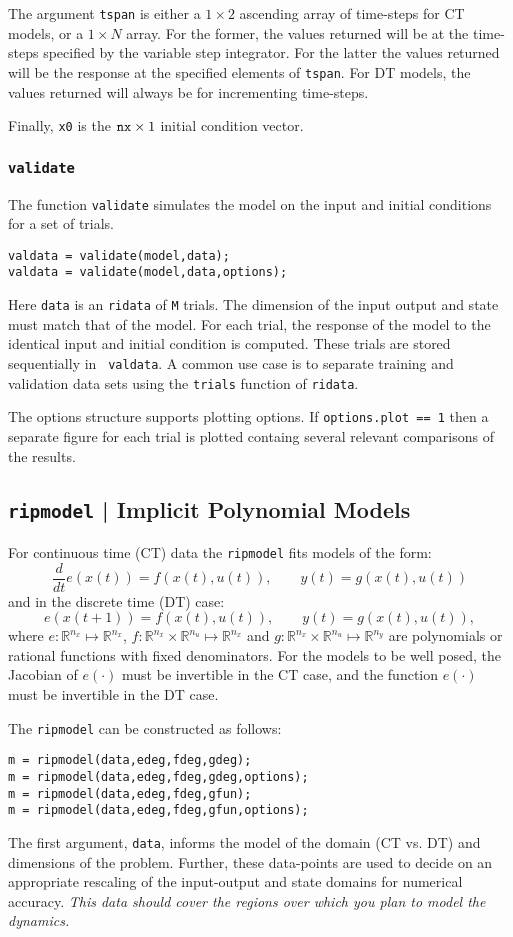 \documentclass{article}
\newcommand{\RR}{\mathbb{R}}
\begin{document}
The argument {\tt tspan} is either a $1 \times 2$ ascending array of
time-steps for CT models, or a $1 \times N$ array.  For the former,
the values returned will be at the time-steps specified by the
variable step integrator.  For the latter the values returned will be
the response at the specified elements of {\tt tspan}.
For DT models, the values returned will always be for incrementing time-steps.

Finally, {\tt x0} is the ${\tt nx} \times 1$ initial condition vector.

\subsubsection{{\tt validate}}
The function {\tt validate} simulates the model on the input and
initial conditions for a set of trials.
\begin{verbatim}
valdata = validate(model,data);
valdata = validate(model,data,options);
\end{verbatim}
Here {\tt data} is an {\tt ridata} of {\tt M} trials.  The dimension
of the input output and state must match that of the model.  For each
trial, the response of the model to the identical input and initial
condition is computed.  These trials are stored sequentially in {\tt
  valdata}.
A common use case is to separate training and validation data sets
using the {\tt trials} function of {\tt ridata}.

The options structure supports plotting options. If {\tt options.plot
  == 1} then a separate figure for each trial is plotted containg
several relevant comparisons of the results.

\subsection{{\tt ripmodel} | Implicit Polynomial Models}
For continuous time (CT) data the {\tt ripmodel}  fits models of the form:
$$ \frac{d}{dt}e(x(t)) = f(x(t),u(t)), \qquad y(t) = g(x(t),u(t))$$
and in the discrete time (DT) case:
$$ e(x(t+1)) = f(x(t),u(t)), \qquad y(t) = g(x(t),u(t)),$$
where $e: \RR^{n_x} \mapsto \RR^{n_x}$, $f: \RR^{n_x} \times
\RR^{n_u}\mapsto \RR^{n_x}$ and $g: \RR^{n_x} \times \RR^{n_u}\mapsto
\RR^{n_y}$ are polynomials or rational functions with fixed
denominators.  For the models to be well posed, the Jacobian of
$e(\cdot)$ must be invertible in the CT case, and the function
$e(\cdot)$ must be invertible in the DT case.

The {\tt ripmodel} can be constructed as follows:
\begin{verbatim}
m = ripmodel(data,edeg,fdeg,gdeg);
m = ripmodel(data,edeg,fdeg,gdeg,options);
m = ripmodel(data,edeg,fdeg,gfun);
m = ripmodel(data,edeg,fdeg,gfun,options);
\end{verbatim}
The first argument, {\tt data}, informs the model of the domain (CT
vs. DT) and dimensions of the problem.  Further, these data-points are
used to decide on an appropriate rescaling of the input-output and
state domains for numerical accuracy.  {\it This data should cover the
regions over which you plan to model the dynamics.}
\end{document}
